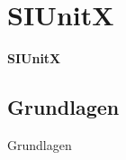 \documentclass["WS\space 16-17\space -\space LaTeX-Kurs\space -\space Praesentation\space -\space 3.tex"]{subfiles}
\begin{document}
\section{SIUnitX}
\begin{frame}[c]
	\begin{center}
		\LARGE \textbf{SIUnitX}
	\end{center}
\end{frame}
\subsection{Grundlagen}
\begin{frame}[c]
	\begin{center}
		\large Grundlagen
	\end{center}
\end{frame}
\end{document}
